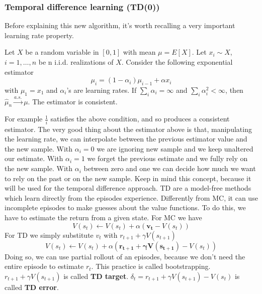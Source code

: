 \documentclass[../main.tex]{subfiles}
\begin{document}
\subsubsection{Temporal difference learning (TD(0))}
Before explaining this new algorithm, it's worth recalling a very important learning rate property.
\begin{proposition}
    Let $X$ be a random variable in $[0, 1]$ with mean $\mu = E[X]$. Let $x_i \sim X$, $i=1,\dots,n$ be n i.i.d. realizations of $X$.
    Consider the following exponential estimator
    \begin{equation*}
        \mu_i = (1-\alpha_i) \mu_{i-1} + \alpha x_i
    \end{equation*}
    with $\mu_1=x_1$ and $\alpha_i$'s are learning rates.
    \newline
    If $\sum_i \alpha_i = \infty$ and $\sum_i \alpha_i^2 < \infty$, then $\hat{\mu}_n \overset{a.s.}{\rightarrow} \mu$. The estimator is consistent.
\end{proposition}
For example $\frac{1}{i}$ satisfies the above condition, and so produces a consistent estimator.
The very good thing about the estimator above is that, manipulating the learning rate, we can interpolate between the previous estimator value and the new sample. With $\alpha_i=0$ we are ignoring new sample and we keep unaltered our estimate. With $\alpha_i = 1$ we forget the previous estimate and we fully rely on the new sample. With $\alpha_i$ between zero and one we can decide how much we want to rely on the past or on the new sample. Keep in mind this concept, because it will be used for the temporal difference approach.
TD are a model-free methods which learn directly from the episodes experience. Differently from MC, it can use incomplete episodes to make guesses about the value functions. To do this, we have to estimate the return from a given state. For MC we have
\begin{equation*}
    V(s_t) \leftarrow V(s_t) + \alpha(\mathbf{v_t}-V(s_t))
\end{equation*}
For TD we simply substitute $v_t$ with $r_{t+1} + \gamma V(s_{t+1})$
\begin{equation*}
    V(s_t) \leftarrow V(s_t) + \alpha(\mathbf{r_{t+1} + \gamma V(s_{t+1})}-V(s_t))
\end{equation*}
Doing so, we can use partial rollout of an episodes, because we don't need the entire episode to estimate $r_t$. This practice is called bootstrapping. $r_{t+1} + \gamma V(s_{t+1})$ is called \textbf{TD target}. $\delta_t = r_{t+1} + \gamma V(s_{t+1}) - V(s_t)$ is called \textbf{TD error}.
\end{document}

